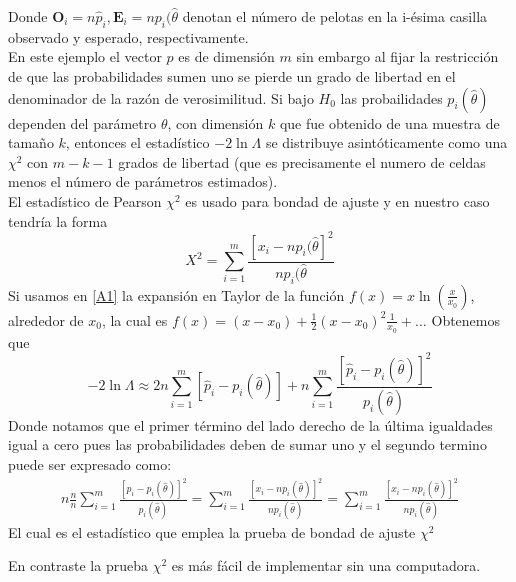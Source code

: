 \documentclass[peerreview]{IEEEtran}
\newenvironment{cframed}[1][blue]
  {\begin{tcolorbox}[colframe=#1,colback=white]}
  {\end{tcolorbox}}
\begin{document}
Donde $\mathbf{O}_i = n\hat{p}_i, \mathbf{E}_i=np_i(\hat{\theta}$ denotan el número de pelotas en la i-ésima casilla observado y esperado, respectivamente.\\
En este ejemplo el vector $p$ es de dimensión $m$ sin embargo al fijar la restricción de que las probabilidades sumen uno se pierde un grado de libertad en el denominador de la razón de verosimilitud. Si bajo $H_0$ las probailidades $p_i(\hat{\theta})$ dependen del parámetro $\theta$, con dimensión $k$  que fue obtenido de una muestra de tamaño $k$, entonces el estadístico $-2 \ln \Lambda$ se distribuye asintóticamente como una $\chi^2$ con $m-k-1$ grados de libertad (que es precisamente el numero de celdas menos el número de parámetros estimados).\\
El estadístico de Pearson $\chi^2$ es usado para bondad de ajuste y en nuestro caso tendría la forma 
\[    X^2 = \sum_{i=1}^{m}\frac{ [ x_i-np_i(\hat{\theta} ]^2}{np_i(\hat{\theta}}
\]
Si usamos en \ref{A1} la expansión en Taylor de la función $f(x) = x \ln \left( \frac{x}{x_0} \right)$, alrededor de $x_0$, la cual es $f(x)=(x-x_0) +\frac{1}{2}(x - x_0)^2\frac{1}{x_0}+\dots$
Obtenemos que 
\[ 
-2 \ln \Lambda \approx 2n \sum_{i=1}^m [\hat{p}_i - p_i ( \hat{\theta})] + n\sum_{i=1}^m\frac{[\hat{p}_i - p_i ( \hat{\theta})]^2}{ p_i ( \hat{\theta})}
\]
Donde notamos que el primer término del lado derecho de la última igualdades igual a cero pues las probabilidades deben de sumar uno y el segundo termino puede ser expresado como:
\[ 
\begin{split}
n\frac{n}{n}\sum_{i=1}^m\frac{[\hat{p}_i - p_i ( \hat{\theta})]^2}{ p_i ( \hat{\theta})} =\sum_{i=1}^m\frac{[x_i - np_i ( \hat{\theta})]^2}{ np_i ( \hat{\theta})} =\sum_{i=1}^m\frac{[x_i - np_i ( \hat{\theta})]^2}{ np_i ( \hat{\theta})} 
\end{split}
\]
El cual es el estadístico que emplea la prueba de bondad de ajuste $\chi^2$
\begin{cframed}[violet]{En contraste la prueba} $\chi^2$ {es más fácil de implementar sin una computadora.}
\end{cframed}
\end{document}
